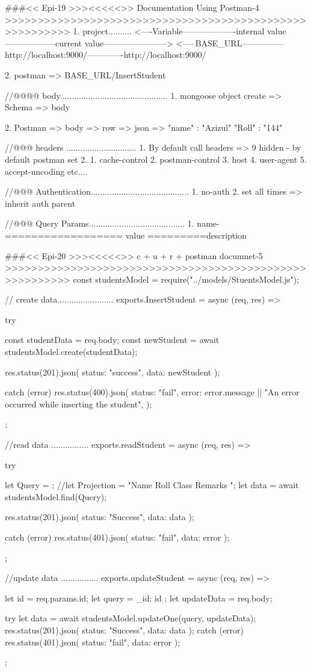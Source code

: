 ###<< Epi-19 >>><<<<<>> Documentation Using Postman-4 >>>>>>>>>>>>>>>>>>>>>>>>>>>>>>>>>>>>>>>>>>>>>>>>>>>>>>>>
1. project..........
<----Variable-------------------internal value------------------current value----------------------->
<-----BASE_URL---------------http://localhost:9000/-------------http://localhost:9000/

2. postman => {{BASE_URL}}/InsertStudent

//@@@@ body..............................................
1. mongoose object create => Schema => body

2. Postman => body => row => json => { "name" : "Azizul" "Roll" : "144"} 

//@@@ headers ..............................
1. By default call headers => 9 hidden - by default postman set 
2. 1. cache-control 2. postman-control 3. host 4. user-agent 5. accept-uncoding etc....

//@@@ Authentication..........................................
1. no-auth
2. set all times => inherit auth parent

//@@@ Query Params.........................................
1. name-================== value =========description

###<< Epi-20 >>><<<<<>> c + u + r + postman documnet-5 >>>>>>>>>>>>>>>>>>>>>>>>>>>>>>>>>>>>>>>>>>>>>>>>>>>>>>>>
const studentsModel = require("../models/StuentsModel.js");

// create data........................
exports.InsertStudent = async (req, res) => {
  try {
    const studentData = req.body;
    const newStudent = await studentsModel.create(studentData);

    res.status(201).json({ status: "success", data: newStudent });
  } catch (error) {
    res.status(400).json({
      status: "fail",
      error: error.message || "An error occurred while inserting the student",
    });
  }
};

//read data ................
exports.readStudent = async (req, res) => {
  try {
    let Query = {};
    //let Projection = "Name Roll Class Remarks ";
    let data = await studentsModel.find(Query);

    res.status(201).json({ status: "Success", data: data });
  } catch (error) {
    res.status(401).json({ status: "fail", data: error });
  }
};

//update data ................
exports.updateStudent = async (req, res) => {
  let id = req.params.id;
  let query = { _id: id };
  let updateData = req.body;

  try {
    let data = await studentsModel.updateOne(query, updateData);
    res.status(201).json({ status: "Success", data: data });
  } catch (error) {
    res.status(401).json({ status: "fail", data: error });
  }
};

